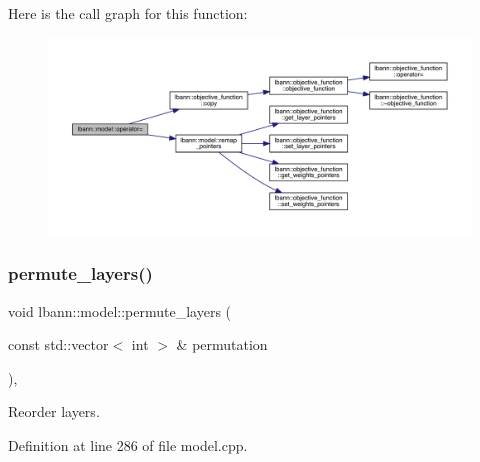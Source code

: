 Here is the call graph for this function\+:\nopagebreak
\begin{figure}[H]
\begin{center}
\leavevmode
\includegraphics[width=350pt]{classlbann_1_1model_a05e8bd6c745ce4414be98462147ec52e_cgraph}
\end{center}
\end{figure}
\mbox{\label{classlbann_1_1model_a31c281b63593a0ec7110664f7309b01a}} 
\subsubsection{\texorpdfstring{permute\+\_\+layers()}{permute\_layers()}}
{\footnotesize\ttfamily void lbann\+::model\+::permute\+\_\+layers (\begin{DoxyParamCaption}\item[{const std\+::vector$<$ int $>$ \&}]{permutation }\end{DoxyParamCaption})\hspace{0.3cm}{\ttfamily [protected]}, {\ttfamily [virtual]}}

Reorder layers. 

Definition at line 286 of file model.\+cpp.


